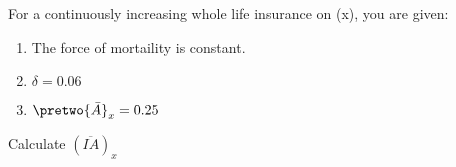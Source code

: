 For a continuously increasing whole life insurance on (x), you are given:
\begin{enumerate}
     \item The force of mortaility is constant.
     \item $\delta = 0.06$
     \item $\pretwo{\bar{A}}_{x} = 0.25$
\end{enumerate}
Calculate $(\overline{IA})_x$
